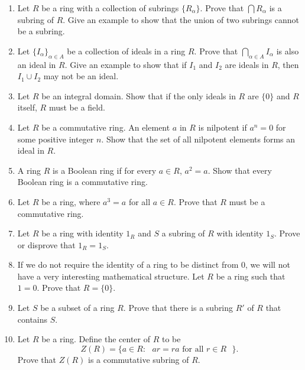 {\begin{enumerate}
\begin{enumerate}
\end{enumerate}
 
 
\item
Let $R$ be a ring with a collection of subrings $\{ R_{\alpha} \}$.
Prove that $\bigcap  R_{\alpha}$ is a subring of $R$.  Give an example
to show that the union of two subrings cannot be a subring.
 
 
\item
Let $\{ I_{\alpha} \}_{\alpha \in A}$ be a collection of ideals in a
ring $R$.  Prove that $\bigcap_{\alpha \in A} I_{\alpha}$ is also an
ideal in $R$. Give an example to show that if $I_1$ and $I_2$ are
ideals in $R$, then $I_1 \cup I_2$ may not be an ideal. 
 
 
\item
Let $R$ be an integral domain.  Show that if the only ideals in $R$ 
are $\{ 0 \}$ and $R$ itself, $R$ must be a field. 
 
 
\item
Let $R$ be a commutative ring.  An element $a$ in $R$ is {\bfi
nilpotent\/} if $a^n =
0$ for some positive integer $n$. Show that the set of all nilpotent
elements forms an ideal in $R$.   
 
 
\item
A ring $R$ is a {\bfi Boolean
ring\/} if for every $a \in R$,
$a^2 = a$. Show that every Boolean ring is a commutative ring.
 
 
\item
Let $R$ be a ring, where $a^3 =a$ for all $a \in R$. Prove that $R$
must be a commutative ring. 
 
 
\item
Let $R$ be a ring with identity $1_R$ and $S$ a subring of $R$ with
identity $1_S$.  Prove or disprove that $1_R = 1_S$.
 
 
 
\item
If we do not require the identity of a ring to be distinct from 0, we
will not have a very interesting mathematical structure. Let $R$ be a
ring such that $1 = 0$. Prove that $R = \{ 0 \}$. 
 
 
\item
Let $S$ be a subset of a ring $R$.  Prove that there is a subring $R'$
of $R$ that contains $S$. 
 
 
\item
Let $R$ be a ring. Define the {\bfi center\/} of $R$ to be 
\[
Z(R) = \{ a \in R : \mbox{ $ar = ra$ for all $r \in R$ } \}.
\]
Prove that $Z(R)$ is a commutative subring of $R$.
 

\end{enumerate}}
